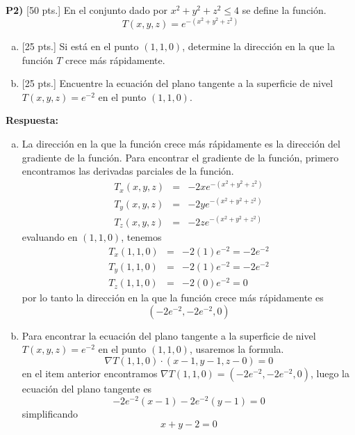 \documentclass{article}
\begin{document}
\newpage
\noindent\textbf{P2) } \textsf{[50 pts.]} En el conjunto dado por $x^2+y^2+z^2\leq4$ se define la función.
  $$T(x,y,z)=e^{-(x^2+y^2+z^2)}$$
\begin{enumerate}[a)]
  \item \textsf{[25 pts.]} Si está en el punto $(1,1,0)$, determine la dirección en la que la función $T$ crece más rápidamente.
  \item \textsf{[25 pts.]} Encuentre la ecuación del plano tangente a la superficie de nivel $T(x,y,z)=e^{-2}$ en el punto $(1,1,0)$.
\end{enumerate}

\vspace{5mm}
\noindent\textbf{Respuesta:} 
\begin{enumerate}[a)]
  \item La dirección en la que la función crece más rápidamente es la dirección del gradiente de la función. Para encontrar el gradiente de la función, primero encontramos las derivadas parciales de la función.
  \begin{eqnarray*}
    T_x(x,y,z) &=& -2xe^{-(x^2+y^2+z^2)}\\
    T_y(x,y,z) &=& -2ye^{-(x^2+y^2+z^2)}\\
    T_z(x,y,z) &=& -2ze^{-(x^2+y^2+z^2)}
  \end{eqnarray*}
  evaluando en $(1,1,0)$, tenemos
  \begin{eqnarray*}
    T_x(1,1,0) &=& -2(1)e^{-2}=-2e^{-2}\\
    T_y(1,1,0) &=& -2(1)e^{-2}=-2e^{-2}\\
    T_z(1,1,0) &=& -2(0)e^{-2}=0
  \end{eqnarray*}
  por lo tanto la dirección en la que la función crece más rápidamente es
  $$\left(-2e^{-2},-2e^{-2},0\right)$$

  \vspace{0.5cm}
  \item Para encontrar la ecuación del plano tangente a la superficie de nivel $T(x,y,z)=e^{-2}$ en el punto $(1,1,0)$, usaremos la formula.
  $$\nabla T(1,1,0)\cdot(x-1,y-1,z-0)=0$$
  en el item anterior encontramos $\nabla T(1,1,0)=\left(-2e^{-2},-2e^{-2},0\right)$, luego la ecuación del plano tangente es
  $$-2e^{-2}(x-1)-2e^{-2}(y-1)=0$$
  simplificando
  $$x+y-2=0$$
\end{enumerate}
\end{document}

